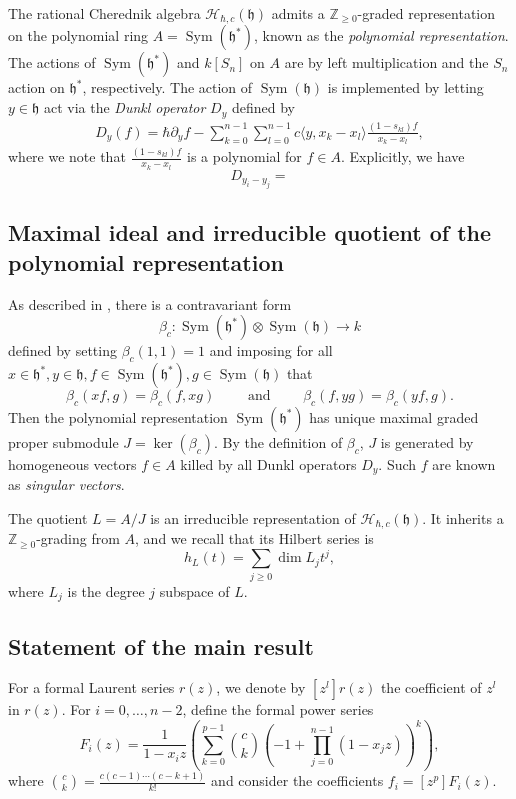 \documentclass{amsart}
\numberwithin{equation}{section}
\theoremstyle{definition}
\newcommand{\ZZ}{\mathbb{Z}}
\newcommand{\h}{\mathfrak{h}}
\newcommand{\HH}{\mathcal{H}}
\newcommand{\Sym}{\operatorname{Sym}}
\begin{document}
The rational Cherednik algebra $\HH_{\hbar, c}(\h)$ admits a $\ZZ_{\geq 0}$-graded representation on the polynomial ring $A = \Sym(\h^*)$, known as the \textit{polynomial representation}.  The actions of $\Sym(\h^*)$ and $k[S_n]$ on $A$ are by left multiplication and the $S_n$ action on $\h^*$, respectively.  The action of $\Sym(\h)$ is implemented by letting $y \in \h$ act via the \textit{Dunkl operator} $D_y$ defined by
\begin{align*}
D_y(f) = \hbar \partial_y f  - \sum_{k=0}^{n-1} \sum_{l=0}^{n-1} c  \langle y, x_k-x_l \rangle \frac{(1-s_{kl}) f}{x_k - x_l},
\end{align*}
where we note that $\frac{(1-s_{kl}) f}{x_k - x_l}$ is a polynomial for $f \in A$. Explicitly, we have  
\[
D_{y_i - y_j} = 
\]


\subsection{Maximal ideal and irreducible quotient of the polynomial representation}

As described in \cite[Section 2.5]{BC1}, there is a contravariant form 
\[
\beta_c: \Sym(\h^*) \otimes \Sym(\h) \to k
\]
defined by setting $\beta_c(1, 1) = 1$ and imposing for all $x \in \h^*, y \in \h, f \in \Sym(\h^*), g \in \Sym(\h)$ that
\[
\beta_c(xf,g)=\beta_c(f,xg) \qquad \text{ and } \qquad \beta_c(f,yg) = \beta_c(yf,g).
\]
Then the polynomial representation $\Sym(\h^*)$ has unique maximal graded proper submodule $J = \ker(\beta_c)$.  By the definition of $\beta_c$, $J$ is generated by homogeneous vectors $f \in A$ killed by all Dunkl operators $D_y$.  Such $f$ are known as \textit{singular vectors}. 

The quotient $L = A/J$ is an irreducible representation of $\HH_{\hbar,c}(\h)$.  It inherits a $\ZZ_{\geq 0}$-grading from $A$, and we recall that its Hilbert series is 
\[
h_L(t) = \sum_{j \geq 0} \dim L_j t^j,
\]
where $L_j$ is the degree $j$ subspace of $L$. 

\subsection{Statement of the main result}

For a formal Laurent series $r(z)$, we denote by $[z^l] r(z)$ the coefficient of $z^l$ in $r(z)$.  For $i = 0, \ldots, n - 2$, define the formal power series
\[
F_i(z)=\frac{1}{1-x_iz} \left(\sum_{k=0}^{p-1} \binom{c}{k}(-1+\prod_{j=0}^{n-1} (1-x_jz))^k\right),
\]
where $\binom{c}{k} = \frac{c (c - 1) \cdots (c - k + 1)}{k!}$ and consider the coefficients $f_i = [z^p] F_i(z)$.
\end{document}
